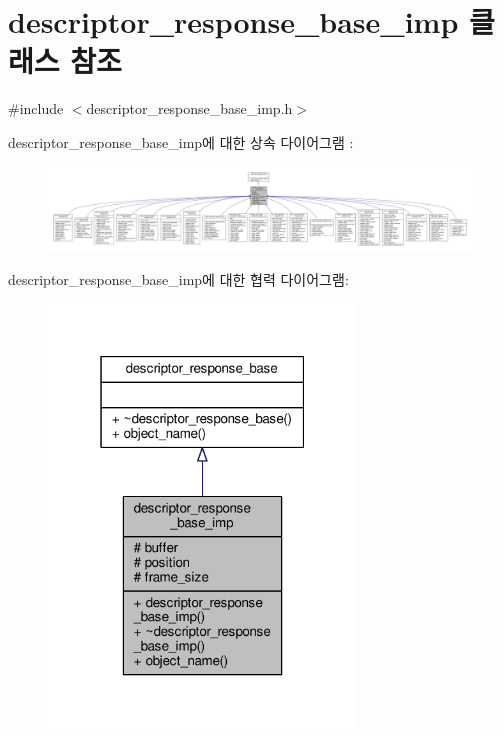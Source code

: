 \hypertarget{classavdecc__lib_1_1descriptor__response__base__imp}{}\section{descriptor\+\_\+response\+\_\+base\+\_\+imp 클래스 참조}
\label{classavdecc__lib_1_1descriptor__response__base__imp}


{\ttfamily \#include $<$descriptor\+\_\+response\+\_\+base\+\_\+imp.\+h$>$}



descriptor\+\_\+response\+\_\+base\+\_\+imp에 대한 상속 다이어그램 \+: 
\nopagebreak
\begin{figure}[H]
\begin{center}
\leavevmode
\includegraphics[width=350pt]{classavdecc__lib_1_1descriptor__response__base__imp__inherit__graph}
\end{center}
\end{figure}


descriptor\+\_\+response\+\_\+base\+\_\+imp에 대한 협력 다이어그램\+:
\nopagebreak
\begin{figure}[H]
\begin{center}
\leavevmode
\includegraphics[width=232pt]{classavdecc__lib_1_1descriptor__response__base__imp__coll__graph}
\end{center}
\end{figure}

